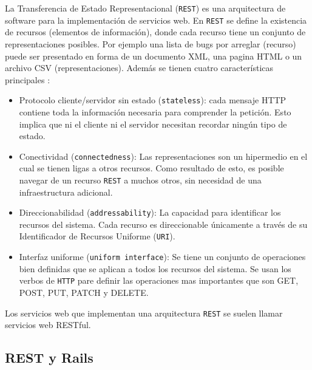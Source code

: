

La Transferencia de Estado Representacional (\texttt{REST}) es una arquitectura
de software para la implementación de servicios web. En \texttt{REST} se define la
existencia de recursos (elementos de información), donde cada recurso tiene un
conjunto de representaciones posibles. Por ejemplo una lista de bugs por arreglar
(recurso) puede ser presentado en forma de un documento XML, una pagina HTML
o un archivo CSV (representaciones). Además se tienen cuatro características
principales \cite[pag.~79]{1_richardson_2007}:

\begin{itemize}
\item Protocolo cliente/servidor sin estado (\texttt{stateless}): cada mensaje
  HTTP contiene toda la información necesaria para comprender la petición.
  Esto implica que ni el cliente ni el servidor necesitan recordar ningún
  tipo de estado.
\item Conectividad (\texttt{connectedness}): Las representaciones son un hipermedio
  en el cual se tienen ligas a otros recursos. Como resultado de esto, es posible
  navegar de un recurso \texttt{REST} a muchos otros, sin necesidad de una
  infraestructura adicional.
\item Direccionabilidad (\texttt{addressability}): La capacidad para
  identificar los recursos del sistema. Cada recurso es direccionable únicamente
  a través de su Identificador de Recursos Uniforme (\texttt{URI}).
\item Interfaz uniforme (\texttt{uniform interface}): Se tiene un conjunto de
  operaciones bien definidas que se aplican a todos los recursos del sistema.
  Se usan los verbos de \texttt{HTTP} pare definir las operaciones mas importantes
  que son GET, POST, PUT, PATCH y DELETE.
\end{itemize}

Los servicios web que implementan una arquitectura \texttt{REST} se suelen llamar
servicios web RESTful.

\subsection{REST y Rails}

